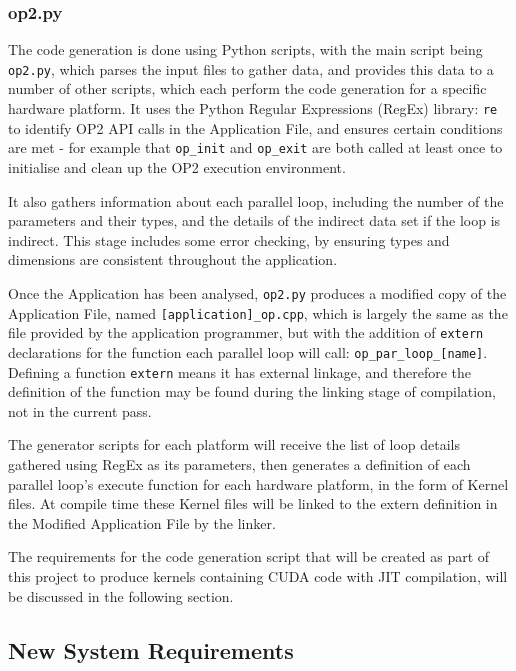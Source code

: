 \subsubsection{op2.py}
\label{ss:impl_op2}
The code generation is done using Python scripts, with the main script being \verb|op2.py|, which parses the input files to gather data, and provides this data to a number of other scripts, which each perform the code generation for a specific hardware platform. It uses the Python Regular Expressions (RegEx) library: \verb|re| \cite{re} to identify OP2 API calls in the Application File, and ensures certain conditions are met - for example that \verb|op_init| and \verb|op_exit| are both called at least once to initialise and clean up the OP2 execution environment.
\par
It also gathers information about each parallel loop, including the number of the parameters and their types, and the details of the indirect data set if the loop is indirect. This stage includes some error checking, by ensuring types and dimensions are consistent throughout the application.
\par
Once the Application has been analysed, \verb|op2.py| produces a modified copy of the Application File, named \verb|[application]_op.cpp|, which is largely the same as the file provided by the application programmer, but with the addition of \verb|extern| declarations for the function each parallel loop will call: \verb|op_par_loop_[name]|. Defining a function \verb|extern| means it has external linkage, and therefore the definition of the function may be found during the linking stage of compilation, not in the current pass.
\par
The generator scripts for each platform will receive the list of loop details gathered using RegEx as its parameters, then generates a definition of each parallel loop's execute function for each hardware platform, in the form of Kernel files. At compile time these Kernel files will be linked to the extern definition in the Modified Application File by the linker.
\par
The requirements for the code generation script that will be created as part of this project to produce kernels containing CUDA code with JIT compilation, will be discussed in the following section.

\subsection{New System Requirements}
\label{ss:reqs}

